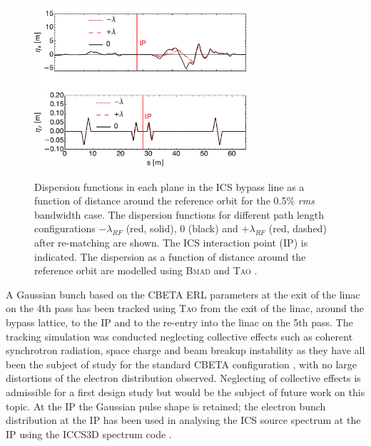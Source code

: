 \documentclass[../main.tex]{subfiles}
\begin{document}
\begin{figure}[!h]
\centering
\includegraphics[width=0.7\textwidth]{Figures/CBETA_Inverse_Compton_Source_Design/dispplotx.pdf}
\includegraphics[width=0.7\textwidth]{Figures/CBETA_Inverse_Compton_Source_Design/dispploty.pdf}
\caption{Dispersion functions in each plane in the ICS bypass line as a function of distance around the reference orbit for the 0.5\% \textit{rms} bandwidth case. The dispersion functions for different path length configurations $-\lambda_{RF}$ (red, solid), $0$ (black) and $+\lambda_{RF}$ (red, dashed) after re-matching are shown. The ICS interaction point (IP) is indicated. The dispersion as a function of distance around the reference orbit are modelled using \textsc{Bmad} \cite{BmadManual} and \textsc{Tao} \cite{TaoManual}.}
\label{fig:CBETA_ICS_dispersion}
\end{figure}
A Gaussian bunch based on the CBETA ERL parameters at the exit of the linac on the 4th pass has been tracked using \textsc{Tao} \cite{TaoManual} from the exit of the linac, around the bypass lattice, to the IP and to the re-entry into the linac on the 5th pass. The tracking simulation was conducted neglecting collective effects such as coherent synchrotron radiation, space charge and beam breakup instability as they have all been the subject of study for the standard CBETA configuration \cite{hoffstaetter2017cbeta,lou2019beam,lou2020coherent}, with no large distortions of the electron distribution observed. Neglecting of collective effects is admissible for a first design study but would be the subject of future work on this topic. At the IP the Gaussian pulse shape is retained; the electron bunch distribution at the IP has been used in analysing the ICS source spectrum at the IP using the \textsc{ICCS3D} spectrum code \cite{krafft2016laser,ranjan2018simulation}.   
\end{document}
